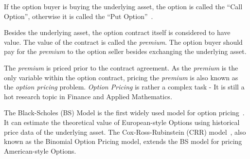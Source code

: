 If the option buyer is buying the underlying asset, the option is called the ``Call Option'', otherwise it is called the ``Put Option''~\cite{smith2004history-option}.

Besides the underlying asset, the option contract itself is considered to have value.
The value of the contract is called the \textit{premium}.
The option buyer should pay for the \textit{premium} to the option seller besides exchanging the underlying asset.

The \textit{premium} is priced prior to the contract agreement.
As the \textit{premium} is the only variable within the option contract,
pricing the \textit{premium} is also known as the \textit{option pricing} problem.
\textit{Option Pricing} is rather a complex task - It is still a hot research topic in Finance and Applied Mathematics.

The Black-Scholes (BS) Model is the first widely used model for option pricing~\cite{black1973pricing}.
It can estimate the theoretical value of European-style Options using historical price data of the underlying asset.
The Cox-Ross-Rubinstein (CRR) model~\cite{cox1979option}, also known as the Binomial Option Pricing model, extends the BS model for pricing American-style Options.

